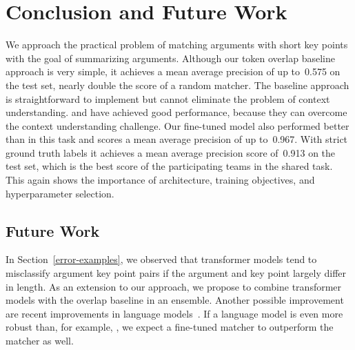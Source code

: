 \section{Conclusion and Future Work}\label{conclusion}

We approach the practical problem of matching arguments with short key points with the goal of summarizing arguments.
Although our token overlap baseline approach is very simple, it achieves a mean average precision of up to~0.575 on 
the test set, nearly double the score of a random matcher. 
The baseline approach is straightforward to implement but cannot eliminate the problem of context understanding. 
\RobertaBase and \BertBase have achieved good performance, because they can overcome the context understanding challenge. 
Our fine-tuned \RobertaBase model also performed better than \BertBase in this task and scores a mean average 
precision of up to~0.967.
With strict ground truth labels it achieves a mean average precision score of~0.913 on the test set, which is the best 
score of the participating teams in the shared task.
This again shows the importance of architecture, training objectives, and hyperparameter selection.

\subsection{Future Work}

In Section~\ref{error-examples}, we observed that transformer models tend to misclassify argument key point pairs if the argument and key point largely differ in length. As an extension to our approach, we propose to combine transformer models with the overlap baseline in an ensemble. Another possible improvement are recent improvements in language models~\cite{Sun2021WFDPSLCZLLWGLSSLOYTWW}.
If a language model is even more robust than, for example, \Roberta, we expect a fine-tuned matcher to outperform the \RobertaBase matcher as well.
